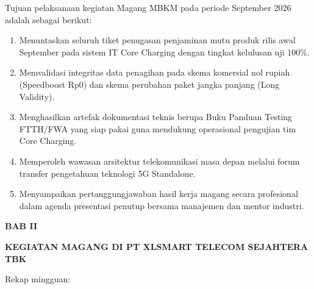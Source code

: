 \documentclass[12pt,a4paper]{article}
\begin{document}
\vspace{0.3cm}
Tujuan pelaksanaan kegiatan Magang MBKM pada periode September 2026 adalah sebagai berikut:
\begin{enumerate}[label=\arabic*.,leftmargin=1.5em,itemsep=2pt,topsep=2pt]
    \item Menuntaskan seluruh tiket penugasan penjaminan mutu produk rilis awal September pada sistem IT Core Charging dengan tingkat kelulusan uji 100\%.
    \item Memvalidasi integritas data penagihan pada skema komersial nol rupiah (Speedboost Rp0) dan skema perubahan paket jangka panjang (Long Validity).
    \item Menghasilkan artefak dokumentasi teknis berupa Buku Panduan Testing FTTH/FWA yang siap pakai guna mendukung operasional pengujian tim Core Charging.
    \item Memperoleh wawasan arsitektur telekomunikasi masa depan melalui forum transfer pengetahuan teknologi 5G Standalone.
    \item Menyampaikan pertanggungjawaban hasil kerja magang secara profesional dalam agenda presentasi penutup bersama manajemen dan mentor industri.
\end{enumerate}

\clearpage
\begin{center}
    {\bfseries\large BAB II\par}
    {\bfseries\large KEGIATAN MAGANG DI PT XLSMART TELECOM SEJAHTERA TBK\par}
\end{center}
\vspace{0.2cm}

\vspace{0.1cm}
\noindent Rekap mingguan:
\end{document}
